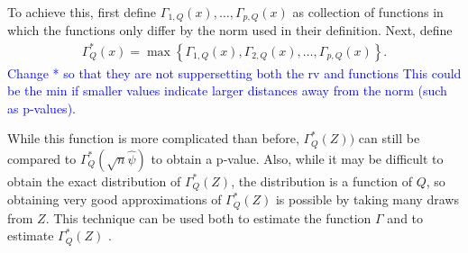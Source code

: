 \documentclass{article}
\newcommand{\norm}{f}
\newcommand{\rvv}{Z}
\newcommand{\distv}{Q}
\begin{document}
To achieve this, first define $\Gamma_{1, \distv}(x), \dots, \Gamma_{p, \distv}(x)$ as collection of functions in which the functions only differ by the norm used in their definition. Next, define
\begin{align*}
	\Gamma^*_\distv(x) = \max\left\{\Gamma_{1, \distv}(x), \Gamma_{2, \distv}(x), \dots, \Gamma_{p, \distv}(x)\right\}.
\end{align*}
\textcolor{blue}{Change * so that they are not suppersetting both the rv and functions}
\textcolor{blue}{This could be the min if smaller values indicate larger distances away from the norm (such as p-values).}  

While this function is more complicated than before,  $\Gamma^*_{\distv}(\rvv))$ can still be compared to $\Gamma^*_{\distv}(\sqrt{n}\hat{\psi})$ to obtain a p-value. Also, while it may be difficult to obtain the exact distribution of $\Gamma_\distv^*(\rvv)$, the distribution is a function of $\distv$, so obtaining very good approximations of $\Gamma_\distv^*(\rvv)$ is possible by taking many draws from $\rvv$. This technique can be used both to estimate the function $\Gamma$ and to estimate $\Gamma^*_\distv(\rvv)$ .


\end{document}
